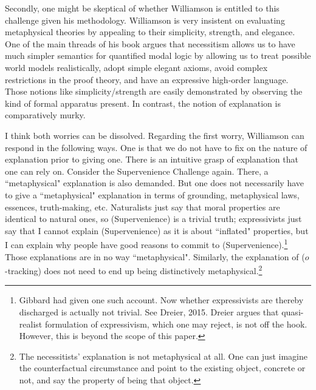 Secondly, one might be skeptical of whether Williamson is entitled to this challenge given his methodology. Williamson is very insistent on evaluating metaphysical theories by appealing to their simplicity, strength, and elegance. One of the main threads of his book argues that necessitism allows us to have much simpler semantics for quantified modal logic by allowing us to treat possible world models realistically, adopt simple elegant axioms, avoid complex restrictions in the proof theory, and have an expressive high-order language. Those notions like simplicity/strength are easily demonstrated by observing the kind of formal apparatus present. In contrast, the notion of explanation is comparatively murky.

I think both worries can be dissolved. 
Regarding the first worry, Williamson can respond in the following ways. 
One is that we do not have to fix on the nature of explanation prior to giving one. There is an intuitive grasp of explanation that one can rely on. Consider the Supervenience Challenge again. There, a ``metaphysical" explanation is also demanded. But one does not necessarily have to give a ``metaphysical" explanation in terms of grounding, metaphysical laws, essences, truth-making, etc. Naturalists just say that moral properties are identical to natural ones, so (Supervenience) is a trivial truth; expressivists just say that I cannot explain (Supervenience) as it is about ``inflated" properties, but I can explain why people have good reasons to commit to (Supervenience).\footnote{Gibbard had given one such account. Now whether expressivists are thereby discharged is actually not trivial. See Dreier, 2015. Dreier argues that quasi-realist formulation of expressivism, which one may reject, is not off the hook. However, this is beyond the scope of this paper.} Those explanations are in no way ``metaphysical". Similarly, the explanation of ($o$-tracking) does not need to end up being distinctively metaphysical.\footnote{The necessitists' explanation is not metaphysical at all. One can just imagine the counterfactual circumstance and point to the existing object, concrete or not, and say the property of being that object.} 
